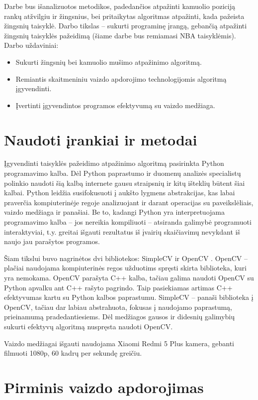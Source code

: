 \documentclass{VUMIFPSkursinis}
\begin{document}
Darbe bus išanalizuotos metodikos, padedančios atpažinti kamuolio poziciją rankų atžvilgiu ir žingsnius, bei pritaikytas algoritmas atpažinti, kada pažeista žingsnių taisyklė. Darbo tikslas – sukurti programinę įrangą, gebančią atpažinti žingsnių taisyklės pažeidimą (šiame darbe bus remiamasi NBA taisyklėmis). Darbo uždaviniai:
\begin{itemize}
 \item Sukurti žingsnių bei kamuolio mušimo atpažinimo algoritmą.
 \item Remiantis skaitmeniniu vaizdo apdorojimo technologijomis algoritmą įgyvendinti.
 \item Įvertinti įgyvendintos programos efektyvumą su vaizdo medžiaga.
\end{itemize}

\section{Naudoti įrankiai ir metodai}
Įgyvendinti taisyklės pažeidimo atpažinimo algoritmą pasirinkta Python programavimo kalba. Dėl Python paprastumo ir duomenų analizės specialistų polinkio naudoti šią kalbą internete gausu straipsnių ir kitų išteklių būtent šiai kalbai. Python leidžia susifokusuoti į aukšto lygmens abstrakcijas, kas labai praverčia kompiuterinėje regoje analizuojant ir darant operacijas su paveikslėliais, vaizdo medžiaga ir panašiai. Be to, kadangi Python yra interpretuojama programavimo kalba – jos nereikia kompiliuoti – atsiranda galimybė programuoti interaktyviai, t.y. greitai išgauti rezultatus iš įvairių skaičiavimų nevykdant iš naujo jau parašytos programos. 

Šiam tikslui buvo nagrinėtos dvi bibliotekos: SimpleCV \cite{SimpleCV} ir OpenCV \cite{OpenCV}. OpenCV – plačiai naudojama kompiuterinės regos užduotims spręsti skirta biblioteka, kuri yra nemokama. OpenCV parašyta C++ kalba, tačiau galima naudoti OpenCV su  Python apvalku ant C++ rašyto pagrindo. Taip pasiekiamas artimas C++ efektyvumas kartu su Python kalbos paprastumu.
SimpleCV – panaši biblioteka į OpenCV, tačiau dar labiau abstrahuota, fokusas į naudojamo paprastumą, prieinamumą pradedantiesiems. Dėl medžiagos gausos ir didesnių galimybių sukurti efektyvų algoritmą nuspręsta naudoti OpenCV.

Vaizdo medžiagai išgauti naudojama Xiaomi Redmi 5 Plus kamera, gebanti filmuoti 1080p, 60 kadrų per sekundę greičiu. 
\section{Pirminis vaizdo apdorojimas}
\end{document}
